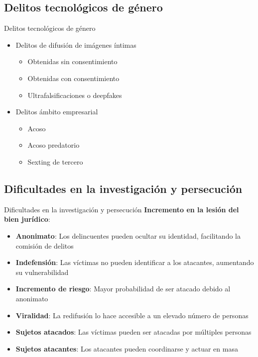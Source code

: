\documentclass{beamer}
\begin{document}
    \subsection{Delitos tecnológicos de género}
    \begin{frame}{Delitos tecnológicos de género}
        \begin{itemize}
            \item Delitos de difusión de imágenes íntimas
            \begin{itemize}
                \item Obtenidas sin consentimiento
                \item Obtenidas con consentimiento
                \item Ultrafalsificaciones o deepfakes
            \end{itemize}
            \item Delitos ámbito empresarial
            \begin{itemize}
                \item Acoso
                \item Acoso predatorio
                \item Sexting de tercero
            \end{itemize}
        \end{itemize}
    \end{frame}

    \subsection{Dificultades en la investigación y persecución}
    \begin{frame}{Dificultades en la investigación y persecución}
        \textbf{Incremento en la lesión del bien jurídico}:
        \begin{itemize}
            \small
            \item \textbf{Anonimato}: Los delincuentes pueden ocultar su identidad, facilitando la comisión de delitos
            \item \textbf{Indefensión}: Las víctimas no pueden identificar a los atacantes, aumentando su vulnerabilidad
            \item \textbf{Incremento de riesgo}: Mayor probabilidad de ser atacado debido al anonimato
            \item \textbf{Viralidad}: La redifusión lo hace accesible a un elevado número de personas
            \item \textbf{Sujetos atacados}: Las víctimas pueden ser atacadas por múltiples personas
            \item \textbf{Sujetos atacantes}: Los atacantes pueden coordinarse y actuar en masa
        \end{itemize}
    \end{frame}
\end{document}
